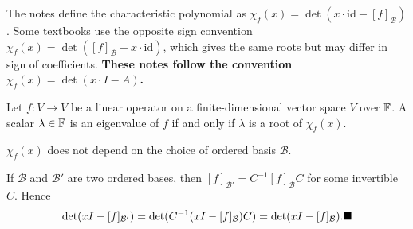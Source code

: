 \begin{warnbox}
The notes define the characteristic polynomial as
$\chi_f(x)=\det(x\cdot\mathrm{id}-[f]_{\mathcal{B}})$.
Some textbooks use the opposite sign convention
$\chi_f(x)=\det([f]_{\mathcal{B}}-x\cdot\mathrm{id})$, which gives the
same roots but may differ in sign of coefficients.  \textbf{These notes
follow the convention $\chi_f(x)=\det(x\cdot I - A)$.}
\end{warnbox}

\begin{corbox}
\label{cor:eigenvalues-roots}
Let $f:V\to V$ be a linear operator on a finite-dimensional vector space
$V$ over $\mathbb{F}$.  A scalar $\lambda\in\mathbb{F}$ is an eigenvalue of $f$ if and
only if $\lambda$ is a root of $\chi_f(x)$.
\end{corbox}

\begin{propbox}
\label{prop:chi-basis-independent}
$\chi_f(x)$ does not depend on the choice of ordered basis $\mathcal{B}$.
\end{propbox}

\begin{proofbox}
If $\mathcal{B}$ and $\mathcal{B}'$ are two ordered bases, then
$[f]_{\mathcal{B}'}=C^{-1}[f]_{\mathcal{B}}C$ for some invertible $C$.
Hence
\[
    \det(xI-[f]_{\mathcal{B}'})
    = \det(C^{-1}(xI-[f]_{\mathcal{B}})C)
    = \det(xI-[f]_{\mathcal{B}}).
    \hfill\blacksquare
\]
\end{proofbox}

